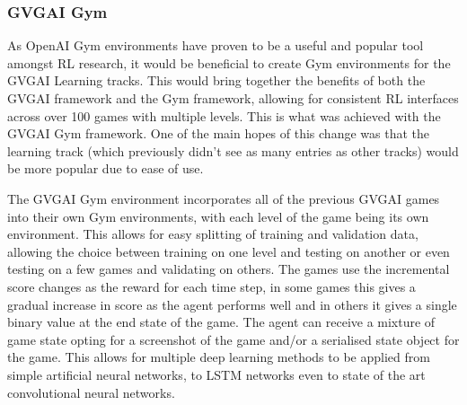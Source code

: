 \documentclass[a4paper]{article}
\begin{document}
\subsubsection{GVGAI Gym}
As OpenAI Gym environments have proven to be a useful and popular tool amongst RL research, it would be beneficial to create Gym environments for the GVGAI Learning tracks.
This would bring together the benefits of both the GVGAI framework and the Gym framework, allowing for consistent RL interfaces across over 100 games with multiple levels.
This is what was achieved with the GVGAI Gym framework\cite{GVGAIGYM}.
One of the main hopes of this change was that the learning track (which previously didn't see as many entries as other tracks) would be more popular due to ease of use.
\par
The GVGAI Gym environment incorporates all of the previous GVGAI games into their own Gym environments, with each level of the game being its own environment.
This allows for easy splitting of training and validation data, allowing the choice between training on one level and testing on another or even testing on a few games and validating on others.
The games use the incremental score changes as the reward for each time step, in some games this gives a gradual increase in score as the agent performs well and in others it gives a single binary value at the end state of the game.
The agent can receive a mixture of game state opting for a screenshot of the game and/or a serialised state object for the game.
This allows for multiple deep learning methods to be applied from simple artificial neural networks, to LSTM networks even to state of the art convolutional neural networks.
\end{document}
